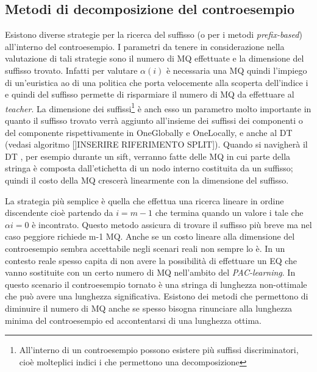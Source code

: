 \subsection[Metodi decomposizione controesempio]{Metodi di decomposizione del controesempio} Esistono diverse strategie per la ricerca del suffisso (o per i metodi \textit{prefix-based}) all'interno del controesempio. I parametri da tenere in considerazione nella valutazione di tali strategie sono il numero di \ac{MQ} effettuate e la dimensione del suffisso trovato. Infatti per valutare $\alpha(i)$ è necessaria una \ac{MQ} quindi l'impiego di un'euristica ao di una politica che porta velocemente alla scoperta dell'indice i e quindi del suffisso permette di risparmiare il numero di \ac{MQ} da effettuare al \textit{teacher}. La dimensione dei suffissi\footnote{All'interno di un controesempio possono esistere più suffissi discriminatori, cioè molteplici indici i che permettono una decomposizione} è anch esso un parametro molto importante in quanto il suffisso trovato verrà aggiunto all'insieme dei suffissi dei componenti o del componente rispettivamente in OneGlobally e OneLocally, e anche al \ac{DT} (vedasi algoritmo []INSERIRE RIFERIMENTO SPLIT]). Quando si navigherà il \ac{DT} , per esempio durante un sift, verranno fatte delle \ac{MQ} in cui parte della stringa è composta dall'etichetta di un nodo interno costituita da un suffisso; quindi il costo della \ac{MQ} crescerà linearmente con la dimensione del suffisso.

La strategia più semplice è quella che effettua una ricerca lineare in ordine discendente cioè partendo da $i = m-1$ che termina quando un valore i tale che $\alpha{i}=0$ è incontrato. Questo metodo assicura di trovare il suffisso più breve ma nel caso peggiore richiede m-1 \ac{MQ}. Anche se un costo lineare alla dimensione del controesempio sembra accettabile negli scenari reali non sempre lo è. In un contesto reale spesso capita di non avere la possibilità di effettuare un \ac{EQ} che vanno sostituite con un certo numero di \ac{MQ} nell'ambito del \textit{PAC-learning}. In questo scenario il controesempio tornato è una stringa di lunghezza non-ottimale che può avere una lunghezza significativa. Esistono dei metodi che permettono di diminuire il numero di \ac{MQ} anche se spesso bisogna rinunciare alla lunghezza minima del controesempio ed accontentarsi di una lunghezza ottima.

\noindent

